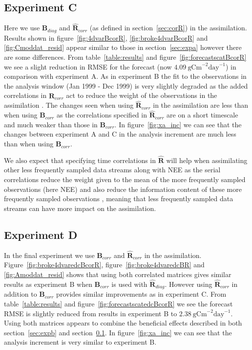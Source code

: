 \documentclass[review]{elsarticle}
\begin{document}
\subsection{Experiment C} \label{sec:expc}

Here we use $\textbf{B}_{diag}$ and $\hat{\textbf{R}}_{corr}$ (as defined in section~\ref{sec:corR}) in the assimilation. Results shown in figure~\ref{fig:4dvarBcorR}, \ref{fig:broke4dvarBcorR} and \ref{fig:Cmoddat_resid} appear similar to those in section~\ref{sec:expa} however there are some differences. From table~\ref{table:results} and figure~\ref{fig:forecastscatBcorR} we see a slight reduction in RMSE for the forecast (now $4.09 ~\text{gCm}^{-2}\text{day}^{-1}$) in comparison with experiment A. As in experiment B the fit to the observations in the analysis window (Jan 1999 - Dec 1999) is very slightly degraded as the added correlations in $\hat{\textbf{R}}_{corr}$ act to reduce the weight of the observations in the assimilation \citep{jarvinen1999variational}. The changes seen when using $\hat{\textbf{R}}_{corr}$ in the assimilation are less than when using $\textbf{B}_{corr}$ as the correlations specified in $\hat{\textbf{R}}_{corr}$ are on a short timescale and much weaker than those in $\textbf{B}_{corr}$. In figure~\ref{fig:xa_inc} we can see that the changes between experiment A and C in the analysis increment are much less than when using $\textbf{B}_{corr}$.  

We also expect that specifying time correlations in $\hat{\textbf{R}}$ will help when assimilating other less frequently sampled data streams along with NEE as the serial correlations reduce the weight given to the mean of the more frequently sampled observations (here NEE) and also reduce the information content of these more frequently sampled observations \citep{jarvinen1999variational, Daley1992}, meaning that less frequently sampled data streams can have more impact on the assimilation.

\subsection{Experiment D}

In the final experiment we use $\textbf{B}_{corr}$ and $\hat{\textbf{R}}_{corr}$ in the assimilation. Figure~\ref{fig:broke4dvaredcBcorR}, figure~\ref{fig:broke4dvaredcBR} and \ref{fig:Amoddat_resid} shows that using both correlated matrices gives similar results as experiment B when $\textbf{B}_{corr}$ is used with $\hat{\textbf{R}}_{diag}$. However using $\hat{\textbf{R}}_{corr}$ in addition to $\textbf{B}_{corr}$ provides similar improvements as in experiment C. From table~\ref{table:results} and figure~\ref{fig:forecastscatedcBcorR} we see the forecast RMSE is slightly reduced from results in experiment B to $2.38 ~\text{gCm}^{-2}\text{day}^{-1}$. Using both matrices appears to combine the beneficial effects described in both section~\ref{sec:expb} and section~\ref{sec:expc}. In figure~\ref{fig:xa_inc} we can see that the analysis increment is very similar to experiment B.
\end{document}
